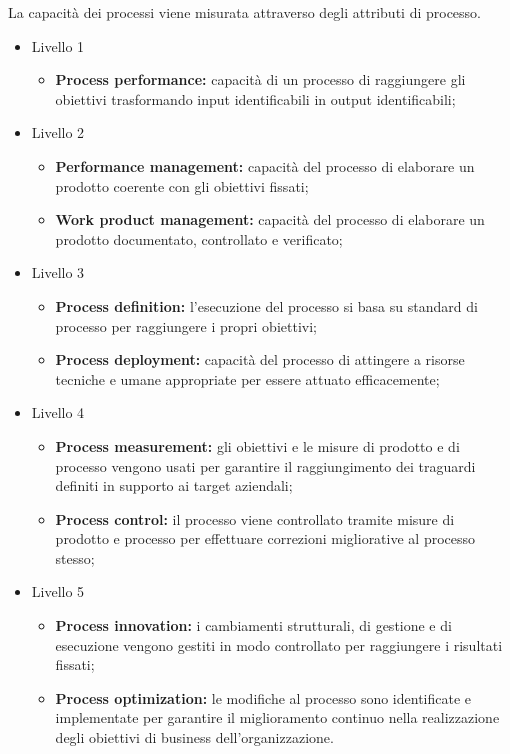 \documentclass[PianoDiQualifica.tex]{subfiles}
\begin{document}
\begin{appendices}
La capacità dei processi viene misurata attraverso degli attributi di processo.
\begin{itemize}
\item Livello 1
	\begin{itemize}
		 \item \textbf{Process performance:} capacità di un processo di raggiungere gli obiettivi trasformando input identificabili in output identificabili;
	\end{itemize}
\item Livello 2
	\begin{itemize}
		 \item \textbf{Performance management:} capacità del processo di elaborare un prodotto coerente con gli obiettivi fissati;
		\item \textbf{Work product management:} capacità del processo di elaborare un prodotto documentato, controllato e verificato;
	\end{itemize}
\item Livello 3
	\begin{itemize}
		\item \textbf{Process definition:} l'esecuzione del processo si basa su standard di processo per raggiungere i propri obiettivi;
		\item \textbf{Process deployment:} capacità del processo di attingere a risorse tecniche e umane appropriate per essere attuato efficacemente;
	\end{itemize}
\item Livello 4
	\begin{itemize}
		 \item \textbf{Process measurement:} gli obiettivi e le misure di prodotto e di processo vengono usati per garantire il raggiungimento dei traguardi definiti in supporto ai target aziendali;
		\item \textbf{Process control:} il processo viene controllato tramite misure di prodotto e processo per effettuare correzioni migliorative al processo stesso;
	\end{itemize}
\item Livello 5
	\begin{itemize}
		 \item \textbf{Process innovation:} i cambiamenti strutturali, di gestione e di esecuzione vengono gestiti in modo controllato per raggiungere i risultati fissati;
		\item \textbf{Process optimization:} le modifiche al processo sono identificate e implementate per garantire il miglioramento continuo nella realizzazione degli obiettivi di business dell'organizzazione. 
	\end{itemize}
\end{itemize}


\end{appendices}
\end{document}
